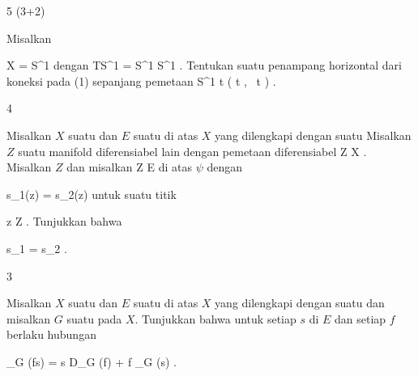 
{5 (3+2)}
{

Misalkan

\mavergleichskette
{\vergleichskette
{ X
}
{ = }{ S^1
}
{  }{
}
{    }{
}
{   }{
}
}
{}{}{}
dengan
 {TS^1 = S^1 \times \R} { S^1
} {.}
 {Tentukan suatu penampang horizontal dari koneksi pada (1) sepanjang pemetaan
\maabbeledisp {} {\R} { S^1
} { t } { \left(  \cos  t   , \,   \sin  t                   \right)
} {.}
}

}
{} {}

{4}
{

Misalkan $X$ suatu
dan $E$ suatu
di atas $X$ yang dilengkapi dengan suatu
Misalkan $Z$ suatu manifold diferensiabel lain dengan pemetaan diferensiabel
\maabb {\psi} { Z } { X
} {.}
Misalkan $Z$
dan misalkan
 { Z } { E
} {}
di atas $\psi$ dengan

\mavergleichskette
{\vergleichskette
{ s_1(z)
}
{ = }{ s_2(z)
}
{  }{
}
{    }{
}
{   }{
}
}
{}{}{}
untuk suatu titik

\mavergleichskette
{\vergleichskette
{ z
}
{ \in }{ Z
}
{  }{
}
{    }{
}
{   }{
}
}
{}{}{.}
Tunjukkan bahwa

\mavergleichskette
{\vergleichskette
{ s_1
}
{ = }{ s_2
}
{  }{
}
{    }{
}
{   }{
}
}
{}{}{.}

}
{} {}

{3}
{

Misalkan $X$ suatu
dan $E$ suatu
di atas $X$ yang dilengkapi dengan suatu
dan misalkan $G$ suatu
pada $X$. Tunjukkan bahwa untuk setiap
$s$ di $E$ dan setiap
$f$
 {} {}
berlaku hubungan

\mavergleichskettedisp
{\vergleichskette
{ \nabla_G (fs)
}
{ =} { s \otimes D_G (f) + f \nabla_G (s)
}
{ } {
}
{ } {
}
{ } {
}
}
{}{}{.}

}
{} {}

